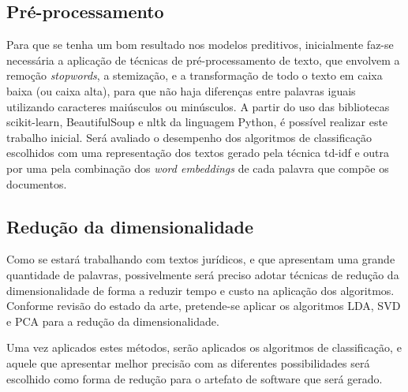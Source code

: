 
\subsection{Pré-processamento}%


Para que se tenha um bom resultado nos modelos preditivos, inicialmente faz-se necessária a aplicação de técnicas de pré-processamento de texto, que envolvem a remoção \textit{stopwords}, a stemização, e a transformação de todo o texto em caixa baixa (ou caixa alta), para que não haja diferenças entre palavras iguais utilizando caracteres maiúsculos ou minúsculos. A partir do uso das bibliotecas scikit-learn, BeautifulSoup e nltk da linguagem Python, é possível realizar este trabalho inicial. Será avaliado o desempenho dos algoritmos de classificação escolhidos com uma representação dos textos gerado pela técnica td-idf e outra por uma pela combinação dos\textit{ word embeddings} de cada palavra que compõe os documentos.

\subsection{\label{sec:reducaoDimensionalidade}Redução da dimensionalidade}%

Como se estará trabalhando com textos jurídicos, e que apresentam uma grande quantidade de palavras, possivelmente será preciso adotar técnicas de redução da dimensionalidade de forma a reduzir tempo e custo na aplicação dos algoritmos. Conforme revisão do estado da arte, pretende-se aplicar os algoritmos LDA, SVD e PCA para a redução da dimensionalidade. 

Uma vez aplicados estes métodos, serão aplicados os algoritmos de classificação, e aquele que apresentar melhor precisão com as diferentes possibilidades será escolhido como forma de redução para o artefato de software que será gerado.




